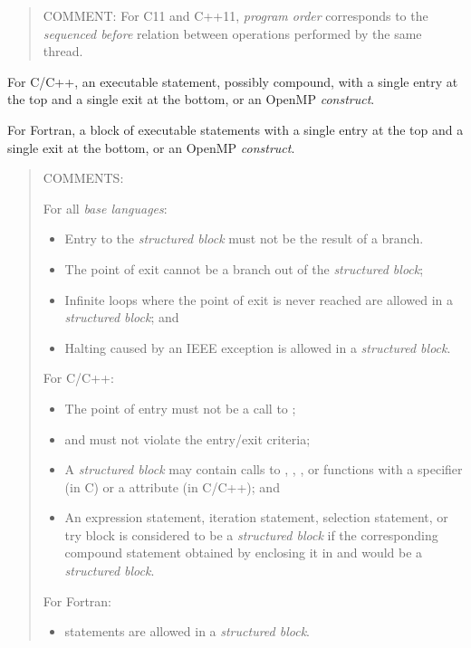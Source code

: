 \begin{quote}
COMMENT: For C11 and C++11, \emph{program order} corresponds to the 
\emph{sequenced before} relation between operations performed by the 
same thread.
\end{quote}
\glossarydefend

\glossarydefstart
For C/C++, an executable statement, possibly compound, with a single 
entry at the top and a single exit at the bottom, or an OpenMP 
\emph{construct}.

For Fortran, a block of executable statements with a single entry at 
the top and a single exit at the bottom, or an OpenMP \emph{construct}.

\begin{quote}
COMMENTS:

For all \emph{base languages}:

\begin{itemize}
\item Entry to the \emph{structured block} must not be the result of a branch.

\item The point of exit cannot be a branch out of the \emph{structured block};

\item Infinite loops where the point of exit is never reached are
allowed in a \emph{structured block}; and

\item Halting caused by an IEEE exception is allowed in a \emph{structured block}.
\end{itemize}

For C/C++:

\begin{itemize}
\item The point of entry must not be a call to ;

\item {} and  must not violate the entry/exit criteria;

\item A \emph{structured block} may contain calls to ,
, ,  or functions
with a  specifier (in C) or a  attribute (in C/C++); and
  
\item An expression statement, iteration statement, selection statement,
or try block is considered to be a \emph{structured block} if the
corresponding compound statement obtained by enclosing it in \tcode{\{}
and \tcode{\}} would be a \emph{structured block}.
\end{itemize}

For Fortran:

\begin{itemize}
\item {} statements are allowed in a \emph{structured block}.
\end{itemize}
\end{quote}
\glossarydefend

